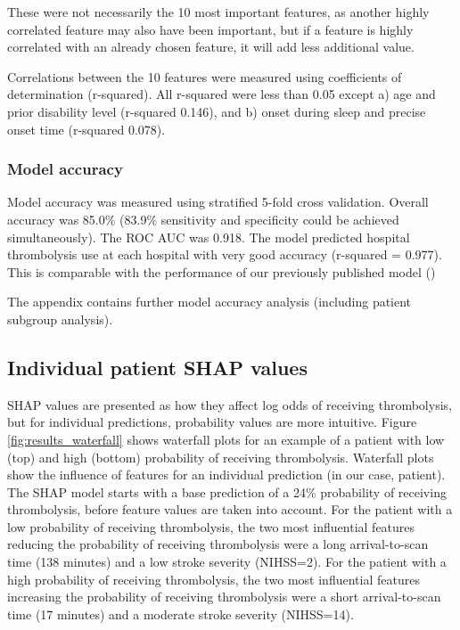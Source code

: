 These were not necessarily the 10 most important features, as another highly correlated feature may also have been important, but if a feature is highly correlated with an already chosen feature, it will add less additional value.

Correlations between the 10 features were measured using coefficients of determination (r-squared). All r-squared were less than 0.05 except a) age and prior disability level (r-squared 0.146), and b) onset during sleep and precise onset time (r-squared 0.078).


\subsubsection{Model accuracy}


Model accuracy was measured using stratified 5-fold cross validation. Overall accuracy was 85.0\% (83.9\% sensitivity and specificity could be achieved simultaneously). The ROC AUC was 0.918. The model predicted hospital thrombolysis use at each hospital with very good accuracy (r-squared = 0.977). This is comparable with the performance of our previously published model ()

The appendix contains further model accuracy analysis (including patient subgroup analysis).

\subsection{Individual patient SHAP values}
SHAP values are presented as how they affect log odds of receiving thrombolysis, but for individual predictions, probability values are more intuitive. Figure \ref{fig:results_waterfall} shows waterfall plots for an example of a patient with low (top) and high (bottom) probability of receiving thrombolysis. Waterfall plots show the influence of features for an individual prediction (in our case, patient). The SHAP model starts with a base prediction of a 24\% probability of receiving thrombolysis, before feature values are taken into account. For the patient with a low probability of receiving thrombolysis, the two most influential features reducing the probability of receiving thrombolysis were a long arrival-to-scan time (138 minutes) and a low stroke severity (NIHSS=2). For the patient with a high probability of receiving thrombolysis, the two most influential features increasing the probability of receiving thrombolysis were a short arrival-to-scan time (17 minutes) and a moderate stroke severity (NIHSS=14). 

